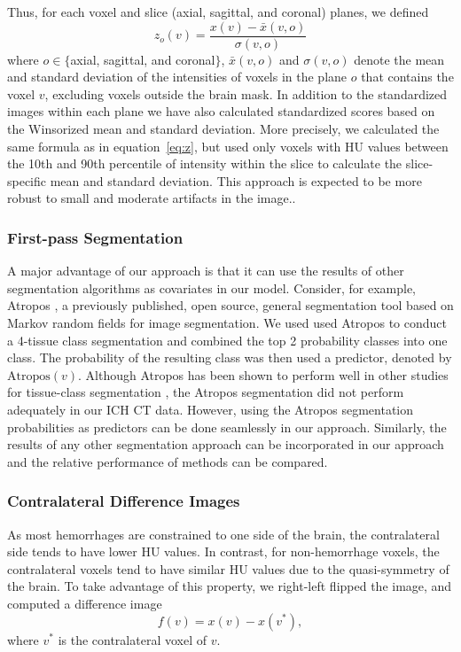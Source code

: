 \documentclass{elsarticle_nonatbib}\usepackage[]{graphicx}\usepackage[]{color}
\begin{document}
Thus, for each voxel and slice (axial, sagittal, and coronal) planes, we defined 
\begin{equation}
z_{o}(v) = \frac{x(v) - \bar{x}(v, o)}{\sigma(v, o)} \label{eq:z}
\end{equation}
where $o \in \{$axial, sagittal, and coronal$\}$, $\bar{x}(v, o)$ and $\sigma(v, o)$ denote the mean and standard deviation of the intensities of voxels in the plane $o$ that contains the voxel $v$, excluding voxels outside the brain mask.   In addition to the standardized images within each plane we have also calculated standardized scores based on the Winsorized mean and standard deviation.  More precisely, we calculated the same formula as in equation~\eqref{eq:z}, but used only voxels with HU values between the 10th and 90th percentile of intensity within the slice to calculate the slice-specific mean and standard deviation. This approach is expected to be more robust to small and moderate artifacts in the image.. 

\subsubsection{First-pass Segmentation} A major advantage of our approach is that it can use the results of other segmentation algorithms as covariates in our model. Consider, for example, Atropos \citep{atropos}, a previously published, open source, general segmentation tool based on Markov random fields for image segmentation.  We used used Atropos to conduct a 4-tissue class segmentation and combined the top 2 probability classes into one class.  The probability of the resulting class was then used a predictor, denoted by $\text{Atropos}(v)$.  Although Atropos has been shown to perform well in other studies for tissue-class segmentation \citep{atropos, menze2015multimodal}, the Atropos segmentation did not perform adequately in our ICH CT data. However, using the Atropos segmentation probabilities as predictors can be done seamlessly in our approach. Similarly, the results of any other segmentation approach can be incorporated in our approach and the relative performance of methods can be compared.

\subsubsection{Contralateral Difference Images}  As most hemorrhages are constrained to one side of the brain, the contralateral side tends to have lower HU values.  In contrast, for non-hemorrhage voxels, the contralateral voxels tend to have similar HU values due to the quasi-symmetry of the brain. To take advantage of this property, we right-left flipped the image, and computed a difference image 
\begin{equation}
f(v) = x(v) - x(v^{*}), \label{eq:flip}
\end{equation}
where $v^{*}$ is the contralateral voxel of $v$.  
\end{document}
